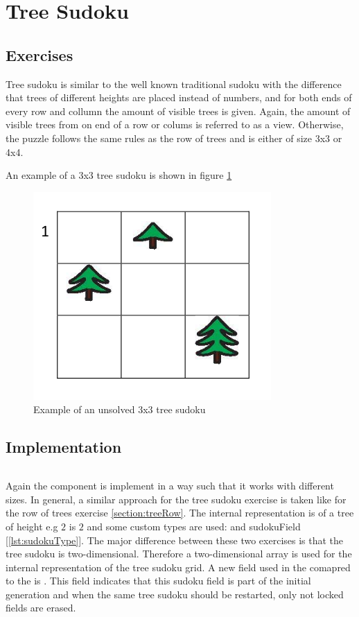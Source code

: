 \section{Tree Sudoku}
\label{section:treeSudoku}

\subsection{Exercises}
Tree sudoku is similar to the well known traditional sudoku with the difference that trees of different heights are placed instead of numbers, and for both ends of every row and collumn the amount of visible trees is given. Again, the amount of visible trees from on end of a row or colums is referred to as a view. Otherwise, the puzzle follows the same rules as the row of trees and is either of size 3x3 or 4x4.

\begin{example}
    An example of a 3x3 tree sudoku is shown in figure \ref{fig:tree_sudoku_example}
\end{example}

\begin{figure} 
    \centering
    \includegraphics[width=0.4 \columnwidth]{figures/tree_sudoku_example.png}
    \caption{Example of an unsolved 3x3 tree sudoku} 
    \label{fig:tree_sudoku_example} 
\end{figure}

\subsection{Implementation}

\begin{lstlisting}[language=TypeScript,caption={},label={lst:}]
\end{lstlisting}

Again the  component is implement in a way such that it works with different sizes. In general, a similar approach for the tree sudoku exercise is taken like for the row of trees exercise \ref{section:treeRow}. The internal representation is of a tree of height e.g $2$ is $2$ and some custom types are used:  and {sudokuField} [\ref{lst:sudokuType}]. The major difference between these two exercises is that the tree sudoku is two-dimensional. Therefore a two-dimensional array is used for the internal representation of the tree sudoku grid. A new field used in the  comapred to the  is . This field indicates that this sudoku field is part of the initial generation and when the same tree sudoku should be restarted, only not locked fields are erased.

